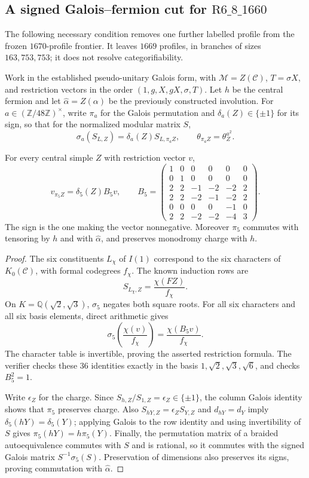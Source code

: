 \subsection{A signed Galois--fermion cut for $\mathrm{R6\_8\_1660}$}
\label{subsec:r1660-signed-galois}
The following necessary condition removes one further labelled profile from
 the frozen $1670$-profile frontier.  It leaves $1669$ profiles, in branches
of sizes $163,753,753$; it does not resolve categorifiability.

Work in the established pseudo-unitary Galois form, with
$\mathcal M=Z(\mathcal C)$, $T=\sigma X$, and restriction vectors in the
order $(1,g,X,gX,\sigma,T)$.  Let $h$ be the central fermion and let
$\widehat\alpha=Z(\alpha)$ be the previously constructed involution.
For $a\in(\mathbb Z/48\mathbb Z)^\times$, write $\pi_a$ for the Galois
permutation and $\delta_a(Z)\in\{\pm1\}$ for its sign, so that for the
normalized modular matrix $S$,
\[
 \sigma_a(S_{L,Z})=\delta_a(Z)S_{L,\pi_a Z},
 \qquad \theta_{\pi_a Z}=\theta_Z^{a^2}.
\]

\begin{lemma}
For every central simple $Z$ with restriction vector $v$,
\[
 v_{\pi_5 Z}=\delta_5(Z)B_5v,\qquad
 B_5=\begin{pmatrix}
1&0&0&0&0&0\\
0&1&0&0&0&0\\
2&2&-1&-2&-2&2\\
2&2&-2&-1&-2&2\\
0&0&0&0&-1&0\\
2&2&-2&-2&-4&3
\end{pmatrix}.
\]
The sign is the one making the vector nonnegative.  Moreover $\pi_5$
commutes with tensoring by $h$ and with $\widehat\alpha$, and preserves
monodromy charge with $h$.
\end{lemma}
\begin{proof}
The six constituents $L_\chi$ of $I(1)$ correspond to the six characters
of $K_0(\mathcal C)$, with formal codegrees $f_\chi$.  The known induction
rows are
\[
 S_{L_\chi,Z}=\frac{\chi(FZ)}{f_\chi}.
\]
On $K=\mathbb Q(\sqrt2,\sqrt3)$, $\sigma_5$ negates both square roots.
For all six characters and all six basis elements, direct arithmetic gives
\[
 \sigma_5\!\left(\frac{\chi(v)}{f_\chi}\right)
       =\frac{\chi(B_5v)}{f_\chi}.
\]
The character table is invertible, proving the asserted restriction formula.
The verifier checks these $36$ identities exactly in the basis
$1,\sqrt2,\sqrt3,\sqrt6$, and checks $B_5^2=1$.

Write $\epsilon_Z$ for the charge.  Since
$S_{h,Z}/S_{1,Z}=\epsilon_Z\in\{\pm1\}$, the column Galois identity
shows that $\pi_5$ preserves charge.  Also
$S_{hY,Z}=\epsilon_ZS_{Y,Z}$ and $d_{hY}=d_Y$ imply
$\delta_5(hY)=\delta_5(Y)$; applying Galois to the row identity and
using invertibility of $S$ gives $\pi_5(hY)=h\pi_5(Y)$.
Finally, the permutation matrix of a braided autoequivalence commutes with
$S$ and is rational, so it commutes with the signed Galois matrix
$S^{-1}\sigma_5(S)$.  Preservation of dimensions also preserves its signs,
proving commutation with $\widehat\alpha$.
\end{proof}

